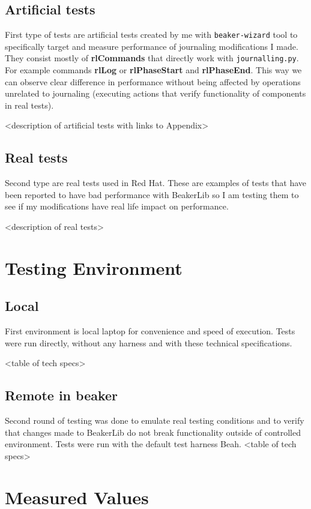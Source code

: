 \subsection{Artificial tests}
First type of tests are artificial tests created by me with \texttt{beaker-wizard} tool to specifically target and measure performance of journaling modifications I made. They consist mostly of \textbf{rlCommands} that directly work with \texttt{journalling.py}. For example commands \textbf{rlLog} or \textbf{rlPhaseStart} and \textbf{rlPhaseEnd}. This way we can observe clear difference in performance without being affected by operations unrelated to journaling (executing actions that verify functionality of components in real tests). 

<description of artificial tests with links to Appendix>

\subsection{Real tests}
Second type are real tests used in Red Hat. These are examples of tests that have been reported to have bad performance with BeakerLib so I am testing them to see if my modifications have real life impact on performance.

<description of real tests>

\section{Testing Environment}

\subsection{Local}
First environment is local laptop for convenience and speed of execution. Tests were run directly, without any harness and with these technical specifications. 

<table of tech specs>

\subsection{Remote in beaker}
Second round of testing was done to emulate real testing conditions and to verify that changes made to BeakerLib do not break functionality outside of controlled environment. Tests were run with the default test harness Beah.
<table of tech specs>

\section{Measured Values}

